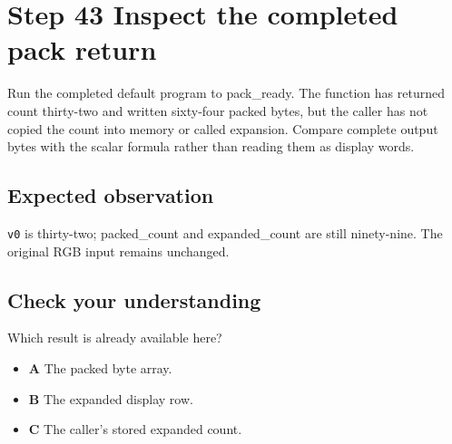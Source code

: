 \section{Step 43 Inspect the completed pack return}\label{rgb-s43}

Run the completed default program to pack\_ready. The function has returned count thirty-two and written sixty-four packed bytes, but the caller has not copied the count into memory or called expansion. Compare complete output bytes with the scalar formula rather than reading them as display words.

\subsection{Expected observation}
\texttt{v0} is thirty-two; packed\_count and expanded\_count are still ninety-nine. The original RGB input remains unchanged.

\subsection{Check your understanding}
Which result is already available here?

\begin{itemize}
  \item \textbf{A} The packed byte array.
  \item \textbf{B} The expanded display row.
  \item \textbf{C} The caller's stored expanded count.
\end{itemize}
